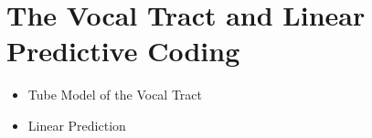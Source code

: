 
\setcounter{chapter}{4}
\chapter{The Vocal Tract and Linear Predictive Coding}
\thispagestyle{plain}

\begin{corollary}

	\hspace*{10mm}
	
	\vspace{5mm} %
	
	\begin{itemize}
			\item Tube Model of the Vocal Tract
			\item Linear Prediction
			
	\end{itemize}
\end{corollary}

\newpage


